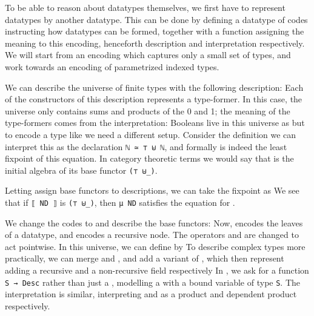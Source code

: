 To be able to reason about datatypes themselves, we first have to represent datatypes by another datatype.
This can be done by defining a datatype of codes instructing how datatypes can be formed, together with a function assigning the meaning to this encoding, henceforth description and interpretation respectively. We will start from an encoding which captures only a small set of types, and work towards an encoding of parametrized indexed types.


We can describe the universe of finite types with the following description:
Each of the constructors of this description represents a type-former. In this case, the universe only contains sums and products of the 0 and 1; the meaning of the type-formers comes from the interpretation:
Booleans live in this universe as
but to encode a type like \bN{} we need a different setup. Consider the definition
we can interpret this as the declaration \texttt{ℕ ≃ ⊤ ⊎ ℕ}, and formally  is indeed the least fixpoint of this equation. In category theoretic terms we would say that  is the initial algebra of its base functor \texttt{(⊤ ⊎\_)}.
 
Letting
assign base functors to descriptions, we can take the fixpoint as
We see that if \texttt{⟦ ND ⟧} is \texttt{(⊤ ⊎\_)}, then \texttt{μ ND} satisfies the equation for .

We change the codes to
and describe the base functors:
Now,  encodes the leaves of a datatype, and  encodes a recursive node. The operators  and  are changed to act pointwise. 
In this universe, we can define  by
To describe complex types more practically, we can merge  and , and add a variant  of , which then represent adding a recursive and a non-recursive field respectively
In , we ask for a function \texttt{S → Desc} rather than just a , modelling a  with a bound variable of type \texttt{S}. The interpretation is similar, interpreting  and  as a product and dependent product respectively.

